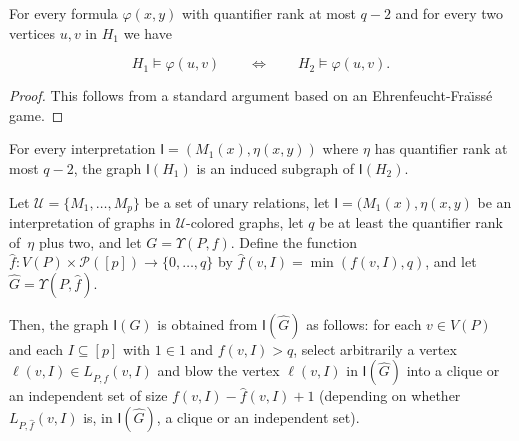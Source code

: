 \documentclass{lmcs}
\theoremstyle{definition}
\begin{document}
\begin{lem}
	For every formula $\varphi(x,y)$ with quantifier rank at most $q-2$ and for every two vertices $u,v$ in $H_1$ we have 
	
	\[
	H_1\models \varphi(u,v)\qquad\iff\qquad H_2\models \varphi(u,v).\]
\end{lem}
\begin{proof}
	This follows from a standard argument based on an Ehrenfeucht-Fra{\"\i}ss\'e game.
\end{proof}

\begin{cor}
	\label{cor:cat_ind}
	For every interpretation $\mathsf I=(M_1(x),\eta(x,y))$ where $\eta$ has quantifier rank at most $q-2$, the graph 
	$\mathsf I(H_1)$ is an induced subgraph of $\mathsf I(H_2)$.
\end{cor}


\begin{lem} 
	\label{lem:cat_tech}
	Let $\mathcal U=\{M_1,\dots,M_p\}$ be a set of unary relations,
	let $\mathsf I=(M_1(x),\eta(x,y)$ be an interpretation of graphs in $\mathcal U$-colored graphs, let $q$ be at least the quantifier rank of~$\eta$ plus two, 
	and let  $G=\Upsilon(P,f)$.
	Define the function $\widehat{f}:V(P)\times\mathcal P([p])\rightarrow \{0,\dots,q\}$ by
	$\widehat f(v,I)=\min(f(v,I),q)$, and let $\widehat G=\Upsilon(P,\widehat f)$.
	
	Then, the graph $\mathsf I(G)$ 
	is obtained from $\mathsf I(\widehat G)$ as follows:
	for each $v\in V(P)$ and each $I\subseteq [p]$ with $1\in 1$ and $f(v,I)>q$, select arbitrarily a vertex $\ell(v,I)\in L_{P,\widehat f}(v,I)$ and
	blow the vertex $\ell(v,I)$ in $\mathsf I(\widehat{G})$ into a clique or an independent set of size $f(v,I)-\widehat{f}(v,I)+1$ (depending on whether $L_{P,\widehat f}(v,I)$ is, in $\mathsf I(\widehat{G})$, a clique or an independent set).
\end{lem}
\end{document}
